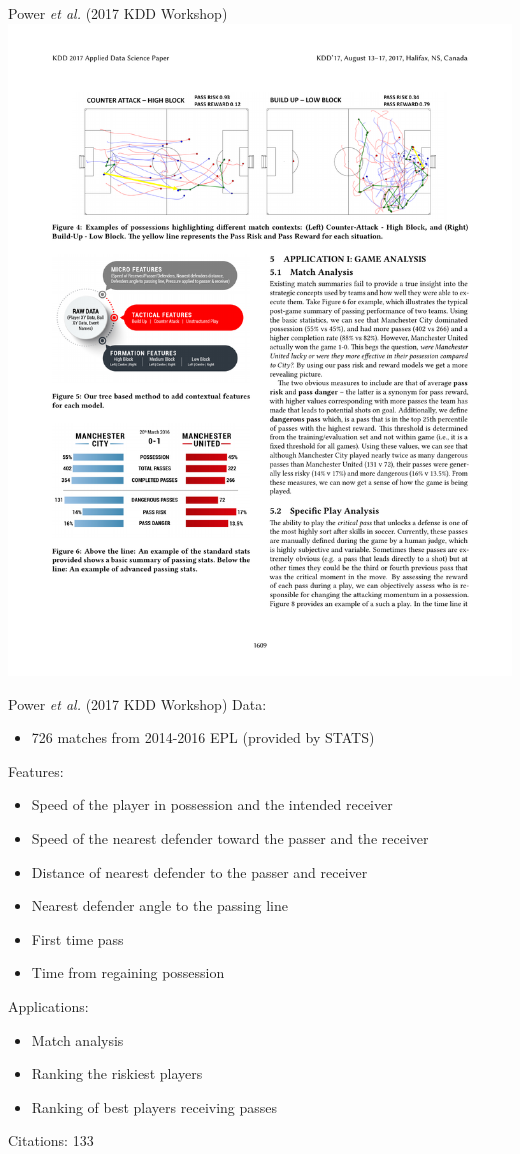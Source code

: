 \documentclass{beamer}
\begin{document}
  \begin{frame}{Power {\it et al.} (2017 KDD Workshop)}
    \includegraphics[width = \textwidth]{images/power_etal_2017.pdf}
  \end{frame}


  \begin{frame}{Power {\it et al.} (2017 KDD Workshop)}
    \small
    Data:
    \begin{itemize}
      \item 726 matches from 2014-2016 EPL (provided by STATS)
    \end{itemize}
    Features:
    \begin{itemize}
      \item Speed of the player in possession and the intended receiver
      \item Speed of the nearest defender toward the passer and the receiver
      \item Distance of nearest defender to the passer and receiver
      \item Nearest defender angle to the passing line
      \item First time pass
      \item Time from regaining possession
    \end{itemize}
    Applications:
    \begin{itemize}
      \item Match analysis
      \item Ranking the riskiest players
      \item Ranking of best players receiving passes
    \end{itemize}
    Citations: 133
  \end{frame}
\end{document}
